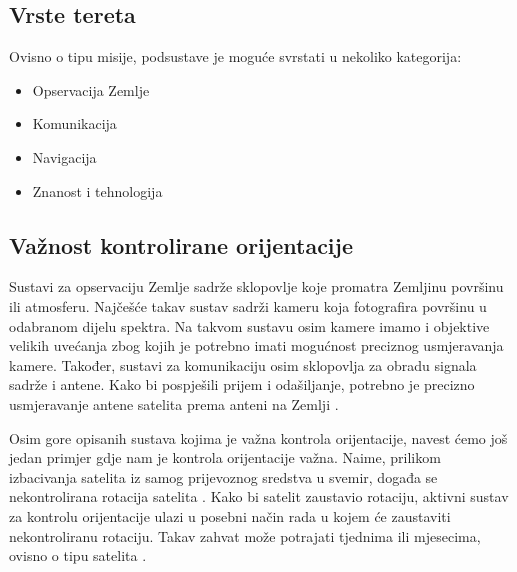 \documentclass[times, utf8, diplomski, numeric]{templates/template}
\begin{document}
{{        \subsection{Vrste tereta}{
            Ovisno o tipu misije, podsustave je moguće svrstati u nekoliko kategorija:

            \begin{itemize}
                \item Opservacija Zemlje
                \item Komunikacija
                \item Navigacija
                \item Znanost i tehnologija
            \end{itemize}

            \subsection{Važnost kontrolirane orijentacije}{
                Sustavi za opservaciju Zemlje sadrže sklopovlje koje promatra Zemljinu površinu ili atmosferu. Najčešće takav sustav sadrži kameru koja fotografira površinu u odabranom dijelu spektra. Na takvom sustavu osim kamere imamo i objektive velikih uvećanja zbog kojih je potrebno imati mogućnost preciznog usmjeravanja kamere. Također, sustavi za komunikaciju osim sklopovlja za obradu signala sadrže i antene. Kako bi pospješili prijem i odašiljanje, potrebno je precizno usmjeravanje antene satelita prema anteni na Zemlji \cite{sattelitePayload}.

                Osim gore opisanih sustava kojima je važna kontrola orijentacije, navest ćemo još jedan primjer gdje nam je kontrola orijentacije važna. Naime, prilikom izbacivanja satelita iz samog prijevoznog sredstva u svemir, događa se nekontrolirana rotacija satelita . Kako bi satelit zaustavio rotaciju, aktivni sustav za kontrolu orijentacije ulazi u posebni način rada  u kojem će zaustaviti nekontroliranu rotaciju. Takav zahvat može potrajati tjednima ili mjesecima, ovisno o tipu satelita \cite{fersat}.
            }
        }
    }
}
\end{document}
